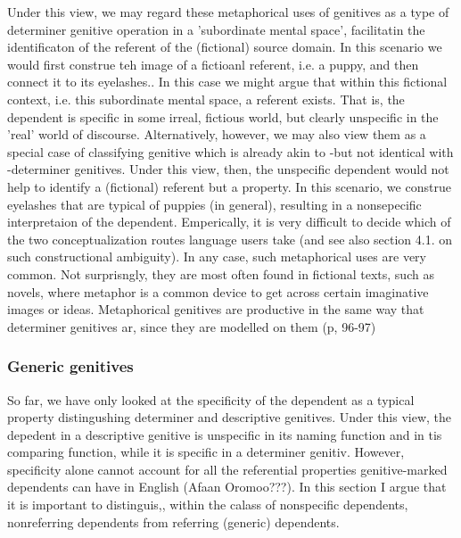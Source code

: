\documentclass[11pt,a4paper]{article}
\begin{document}
	Under this view, we may regard these metaphorical uses of genitives as a type of determiner genitive operation in a 'subordinate mental space',
	facilitatin the identificaton of the referent of the (fictional) source domain. In this scenario we would first construe teh image
	of a fictioanl referent, i.e. a puppy, and then connect it to its eyelashes.. In this case we might argue that within this 
	fictional context, i.e. this subordinate mental space, a referent exists. That is, the dependent is specific in some irreal, 
	fictious world, but clearly unspecific in the  'real' world of discourse. Alternatively, however, we may also view them as a special case of 
	classifying genitive which is already akin to -but not identical with -determiner genitives. Under this view, then, 
	the unspecific dependent would not help to identify a (fictional) referent but a property. In this scenario, we construe
	eyelashes that are typical of puppies (in general), resulting in a nonsepecific interpretaion of the dependent. 
	Emperically, it is very difficult to decide which of the two conceptualization routes language users take (and see also
	section 4.1. on such constructional ambiguity). In any case, such metaphorical uses are very common. Not surprisngly, they are 
	most often found in fictional texts, such as novels, where metaphor is a common device to get across certain imaginative
	images or ideas. Metaphorical genitives are productive in the same way that determiner genitives ar, since they are modelled on them (p, 96-97)
	
	
	\subsubsection{Generic genitives}
	
	So far, we have only looked at the specificity of the dependent as a typical property distingushing determiner and 
	descriptive genitives. Under this view, the depedent in a descriptive genitive is unspecific in its naming function and 
	in tis comparing function, while it is specific in a determiner genitiv. However, specificity alone cannot account
	for all the referential properties genitive-marked dependents can have in English (Afaan Oromoo???). In this section I argue that it is important 
	to distinguis,, within the calass of nonspecific dependents, nonreferring dependents from referring (generic) dependents.
	
\end{document}
